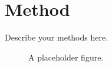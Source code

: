 \section{Method}
Describe your methods here.

\begin{figure}[h]
  \centering
  \caption{A placeholder figure.}
\end{figure}
